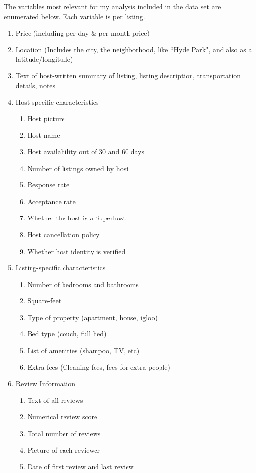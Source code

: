 \documentclass[11pt, oneside]{article}
\begin{document}
The variables most relevant for my analysis included in the data set are enumerated below. Each variable is per listing. 

\singlespacing
\begin{enumerate}
\item Price (including per day \& per month price)
\item Location (Includes the city, the neighborhood, like ``Hyde Park", and also as a latitude/longitude)
\item Text of host-written summary of listing, listing description, transportation details, notes

\item Host-specific characteristics
\begin{enumerate}
\item Host picture 
\item Host name
\item Host availability out of 30 and 60 days
\item Number of listings owned by host
\item Response rate
\item Acceptance rate
\item Whether the host is a Superhost
\item Host cancellation policy
\item Whether host identity is verified 
\end{enumerate}

\item Listing-specific characteristics
\begin{enumerate}
\item Number of bedrooms and bathrooms
\item Square-feet
\item Type of property (apartment, house, igloo)
\item Bed type (couch, full bed)
\item List of amenities (shampoo, TV, etc)
\item Extra fees (Cleaning fees, fees for extra people)
\end{enumerate}

\item Review Information
\begin{enumerate}
\item Text of all reviews
\item Numerical review score
\item Total number of reviews
\item Picture of each reviewer
\item Date of first review and last review
\end{enumerate}
\end{enumerate}
\doublespacing
\end{document}
